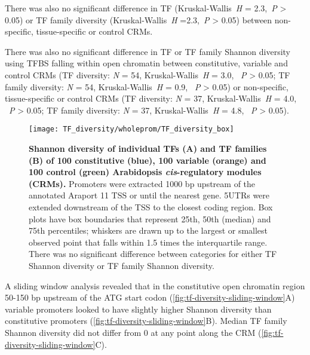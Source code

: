 \documentclass[../main.tex]{subfiles}
\begin{document}
There was also no significant difference in TF (Kruskal\hyp{}Wallis~\textit{H} = 2.3,~\textit{P} \textgreater{} 0.05) or TF family diversity (Kruskal\hyp{}Wallis~\textit{H} =2.3,~\textit{P} \textgreater{} 0.05) between non\hyp{}specific, tissue\hyp{}specific or control CRMs.

There was also no significant difference in TF or TF family Shannon diversity using TFBS falling within open chromatin between constitutive, variable and control CRMs (TF diversity: \textit{N} = 54, Kruskal\hyp{}Wallis~\textit{H} = 3.0, ~\textit{P} \textgreater{} 0.05; TF family diversity: \textit{N} = 54, Kruskal\hyp{}Wallis~\textit{H} = 0.9, ~\textit{P} \textgreater{} 0.05) or non\hyp{}specific, tissue\hyp{}specific or control CRMs (TF diversity: \textit{N} = 37, Kruskal\hyp{}Wallis~\textit{H} = 4.0, ~\textit{P} \textgreater{} 0.05; TF family diversity: \textit{N} = 37, Kruskal\hyp{}Wallis~\textit{H} = 4.8, ~\textit{P} \textgreater{} 0.05).

\begin{figure}[hbt!]
	\begin{center}
		\capstart
		\texttt{[image: TF\_diversity/wholeprom/TF\_diversity\_box]}
		\caption{
			\textbf{Shannon diversity of individual TFs (A) and TF families (B) of 100 constitutive (blue), 100 variable (orange) and 100 control (green) Arabidopsis \textit{cis}\hyp{}regulatory modules (CRMs).}
			Promoters were extracted 1000 bp upstream of the annotated Araport 11 \autocite{chengAraport11CompleteReannotation2017} TSS or until the nearest gene.
			5UTRs were extended downstream of the TSS to the closest coding region.  Box plots have box boundaries that represent 25th, 50th (median) and 75th percentiles; whiskers are drawn up to the largest or smallest observed point that falls within 1.5 times the interquartile range.
			There was no significant difference between categories for either TF Shannon diversity or TF family Shannon diversity.
			\label{fig:tf-diversity-wholeprom}
		}
	\end{center}
\end{figure}

A sliding window analysis revealed that in the constitutive open chromatin region 50-150 bp upstream of the ATG start codon (\autoref{fig:tf-diversity-sliding-window}A) variable promoters looked to have slightly higher Shannon diversity than constitutive promoters (\autoref{fig:tf-diversity-sliding-window}B). Median TF family Shannon diversity did not differ from 0 at any point along the CRM (\autoref{fig:tf-diversity-sliding-window}C).
\end{document}
